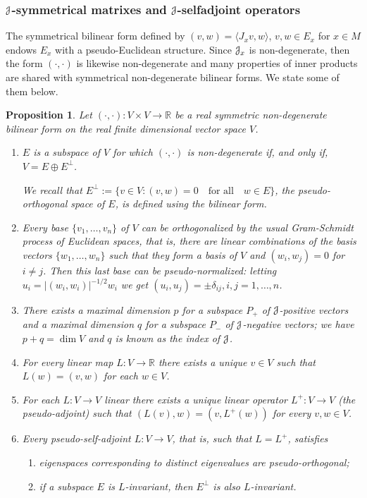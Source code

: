 \documentclass[12pt,reqno]{amsart}
\numberwithin{equation}{section}
\theoremstyle{plain}
\newtheorem{proposition}[theorem]{Proposition}
\theoremstyle{definition}
\newcommand{\RR}{{\mathbb R}}
\newcommand{\J}{\EuScript{J}}
\begin{document}
\subsubsection{$\J$-symmetrical matrixes and $\J$-selfadjoint operators}
\label{sec:j-symmetr-matrix}

The symmetrical bilinear form defined by $(v,w)=\langle J_x
v,w\rangle$, $v,w\in E_x$ for $x\in M$ endows
$E_x$ with a pseudo-Euclidean structure. Since $\J_x$ is
non-degenerate, then the form $(\cdot,\cdot)$ is likewise
non-degenerate and many properties of inner products are
shared with symmetrical non-degenerate bilinear forms. We
state some of them below.

\begin{proposition}
  \label{pr:propbilinear}
  Let $(\cdot,\cdot):V\times V \to\RR$ be a real symmetric
  non-degenerate bilinear form on the real finite
  dimensional vector space $V$.
  \begin{enumerate}
  \item $E$ is a subspace of $V$ for which $(\cdot,\cdot)$ is
    non-degenerate if, and only if, $V=E\oplus E^\perp$.

    We recall that $E^\perp:=\{v\in V: (v,w)=0
    \quad\text{for all}\quad w\in E\}$, the
    pseudo-orthogonal space of $E$, is defined using the
    bilinear form.
  \item Every base $\{v_1,\dots,v_n\}$ of $V$ can be
    orthogonalized by the usual Gram-Schmidt process of
    Euclidean spaces, that is, there are linear combinations
    of the basis vectors $\{w_1,\dots, w_n\}$ such that they
    form a basis of $V$ and
    $(w_i,w_j)=0$ for $i\neq j$.  Then this last base can be
    pseudo-normalized: letting $u_i=|(w_i,w_i)|^{-1/2}w_i$ we
    get $(u_i,u_j)=\pm\delta_{ij}, i,j=1,\dots,n$.
  \item There exists a maximal dimension $p$ for a subspace
    $P_+$ of $\J$-positive vectors and a maximal dimension
    $q$ for a subspace $P_-$ of $\J$-negative vectors;
    we have $p+q=\dim V$ and $q$ is known
    as the \emph{index} of $\J$.
  \item For every linear map $L:V\to\RR$ there exists a
    unique $v\in V$ such that $L(w)=(v,w)$ for each $w\in V$.
  \item For each $L:V\to V$ linear there exists a unique
    linear operator $L^+:V\to V$ (the pseudo-adjoint) such that
    $(L(v),w)=(v,L^+(w))$ for every $v,w\in V$.
  \item Every pseudo-self-adjoint $L:V\to V$, that is,
    such that $L=L^+$, satisfies
    \begin{enumerate}
    \item eigenspaces corresponding to distinct eigenvalues
      are pseudo-orthogonal;
    \item if a subspace $E$ is $L$-invariant, then $E^\perp$
      is also $L$-invariant.
    \end{enumerate}
  \end{enumerate}
\end{proposition}
\end{document}
